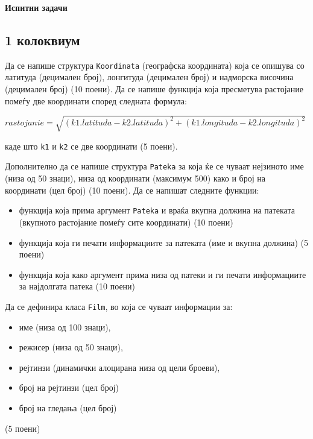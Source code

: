\documentclass[12pt,a4paper]{exam}
\begin{document}
\pagestyle{headandfoot}
\headrule
{}
\begin{center}
\Large{\textbf{Испитни задачи}}
\end{center}
\begin{questions}
\section{1 колоквиум}

\question
Да се напише структура \texttt{Koordinata} (географска координата) која се опишува со
латитуда (децимален број), лонгитуда (децимален број) и надморска височина
(децимален број) (10 поени). Да се напише функција која пресметува растојание
помеѓу две координати според следната формула:

$rastojanie = \sqrt{(k1.latituda − k 2.latituda)^2 + (k1.longituda −
k2.longituda )^2}$

каде што \texttt{k1} и \texttt{k2} се две координати (5 поени). 

Дополнително да се напише структура \texttt{Pateka} за која ќе се чуваат
нејзиното име (низа од 50 знаци), низа од координати (максимум 500) како и број
на координати (цел број) (10 поени). Да се напишат следните функции: 
\begin{itemize}
  \item функција која прима аргумент \texttt{Pateka} и враќа вкупна должина на патеката
  (вкупното растојание помеѓу сите координати) (10 поени)
  \item функција која ги печати информациите за патеката (име и вкупна должина)
  (5 поени) 
  \item функција која како аргумент прима низа од патеки и ги печати
  информациите за најдолгата патека (10 поени)
\end{itemize}

\question

Да се дефинира класа \texttt{Film}, во која се чуваат информации за:
\begin{itemize}
  \item име (низа од 100 знаци),
  \item режисер (низа од 50 знаци),
  \item рејтинзи (динамички алоцирана низа од цели броеви),
  \item број на рејтинзи (цел број)
  \item број на гледања (цел број)
\end{itemize}
(5 поени)


\end{questions}
\end{document}
